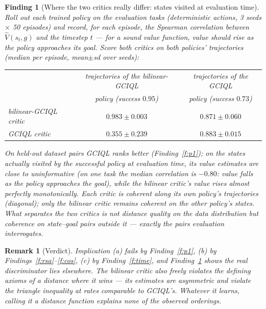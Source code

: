 \documentclass[10pt]{article}
\newtheorem{finding}{Finding}
\newtheorem{remark}{Remark}
\begin{document}
\begin{finding}[Where the two critics really differ: states visited at evaluation
time]\label{f:p2}
Roll out each trained policy on the evaluation tasks (deterministic actions, 3 seeds
$\times$ 50 episodes) and record, for each episode, the Spearman correlation between
$\hat V(s_t, g)$ and the timestep $t$ --- for a sound value function, value should rise
as the policy approaches its goal. Score \emph{both} critics on \emph{both} policies'
trajectories (median per episode, mean$\pm$sd over seeds):
\begin{center}
\begin{tabular}{lcc}
\toprule
 & trajectories of the bilinear-GCIQL & trajectories of the GCIQL\\
 & policy (success $0.95$) & policy (success $0.73$)\\
\midrule
bilinear-GCIQL critic & $0.983\pm0.003$ & $0.871\pm0.060$\\
GCIQL critic          & $\mathbf{0.355\pm0.239}$ & $0.883\pm0.015$\\
\bottomrule
\end{tabular}
\end{center}
On held-out dataset pairs GCIQL ranks better (Finding~\ref{f:p1}); on the states actually
visited by the \emph{successful} policy at evaluation time, its value estimates are close
to uninformative (on one task the median correlation is $-0.80$: value falls as the policy
approaches the goal), while the bilinear critic's value rises almost perfectly
monotonically. Each critic is coherent along its own policy's trajectories (diagonal);
only the bilinear critic remains coherent on the \emph{other} policy's states. What
separates the two critics is not distance quality on the data distribution but coherence
on state--goal pairs \emph{outside} it --- exactly the pairs evaluation interrogates.
\end{finding}

\begin{remark}[Verdict]
Implication (a) fails by Finding~\ref{f:p1}, (b) by
Findings~\ref{f:rsa}--\ref{f:cos}, (c) by Finding~\ref{f:time}, and
Finding~\ref{f:p2} shows the real discriminator lies elsewhere. The bilinear critic also
freely violates the defining axioms of a distance where it wins --- its estimates are
asymmetric and violate the triangle inequality at rates comparable to GCIQL's. Whatever
it learns, calling it a distance function explains none of the observed orderings.
\end{remark}
\end{document}

